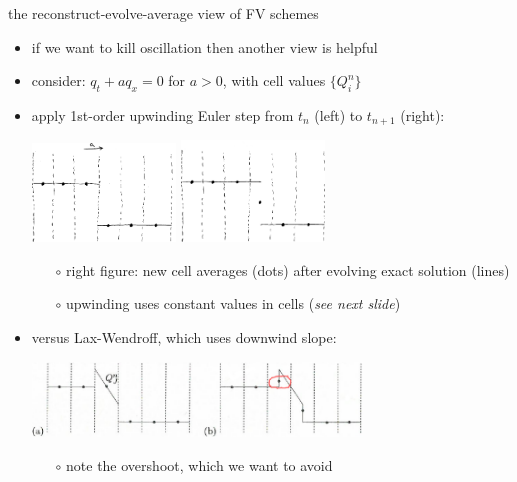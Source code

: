 \documentclass[10pt,dvipsnames,usepdftitle=false,
hyperref={pdftitle = {Finite volume methods},
    pdfauthor = {Ed Bueler}}]{beamer}
\begin{document}
\begin{frame}{the reconstruct-evolve-average view of FV schemes}

\begin{itemize}
\item if we want to kill oscillation then another view is helpful
\item consider: $q_t + a q_x=0$ for $a>0$, with cell values $\{Q_i^n\}$
\item apply 1st-order upwinding Euler step from $t_n$ (left) to $t_{n+1}$ (right):

\begin{center}
\quad \includegraphics[width=0.3\textwidth]{figs/upreconstructleft} \qquad \includegraphics[width=0.3\textwidth]{figs/upreconstructright}
\end{center}

    \begin{itemize}
    \item[$\circ$] right figure: new cell averages (dots) after evolving exact solution (lines)
    \item[$\circ$] upwinding uses constant values in cells (\emph{see next slide})
    \end{itemize}
\item versus Lax-Wendroff, which uses downwind slope:

\begin{center}
\includegraphics[width=0.69\textwidth]{figs/leveque6p4}
\end{center}

    \begin{itemize}
    \item[$\circ$] note the \alert{overshoot}, which we want to avoid
    \end{itemize}
\end{itemize}
\end{frame}
\end{document}
